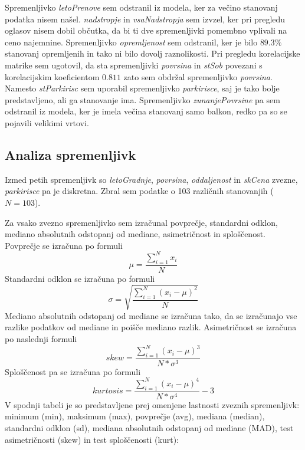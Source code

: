 \documentclass[a4paper, 12pt]{article}
\begin{document}
Spremenljivko \textit{letoPrenove} sem odstranil iz modela, ker za večino
stanovanj podatka nisem našel. \textit{nadstropje} in \textit{vsaNadstropja}
sem izvzel, ker pri pregledu oglasov nisem dobil občutka, da bi ti dve
spremenljivki pomembno vplivali na ceno najemnine. Spremenljivko
\textit{opremljenost} sem odstranil, ker je bilo $ 89.3\% $ stanovanj
opremljenih in tako ni bilo dovolj raznolikosti. Pri pregledu korelacijske
matrike sem ugotovil, da sta spremenljivki \textit{povrsina} in
\textit{stSob} povezani s korelacijskim koeficientom $ 0.811 $ zato sem obdržal
spremenljivko \textit{povrsina}. Namesto \textit{stParkirisc} sem uporabil
spremenljivko \textit{parkirisce}, saj je tako bolje predstavljeno, ali ga
stanovanje ima. Spremenljivko \textit{zunanjePovrsine} pa sem  odstranil iz
modela, ker je imela večina stanovanj samo balkon, redko pa so se pojavili
velikimi vrtovi.

\subsection{Analiza spremenljivk}

Izmed petih spremenljivk so \textit{letoGradnje}, \textit{povrsina},
\textit{oddaljenost} in \textit{skCena} zvezne, \textit{parkirisce} pa je
diskretna. Zbral sem podatke o 103 različnih stanovanjih ($ N = 103 $).

Za vsako zvezno spremenljivko sem izračunal povprečje, standardni odklon,
mediano absolutnih odstopanj od mediane, asimetričnost in sploščenost.
Povprečje se izračuna po formuli
\begin{equation}
	\mu = \frac{\sum\limits_{i=1}^{N} x_{i}}{N}
\end{equation}
Standardni odklon se izračuna po formuli
\begin{equation}
	\sigma = \sqrt{\frac{\sum\limits_{i=1}^{N}\left(x_{i}-\mu\right)^{2}}{N}}
\end{equation}
Mediano absolutnih odstopanj od mediane se izračuna tako, da se izračunajo vse
razlike podatkov od mediane in poišče mediano razlik. \newline
Asimetričnost se izračuna po naslednji formuli
\begin{equation}
	skew = \frac{\sum\limits_{i=1}^{N}\left(x_{i}-\mu\right)^{3}}{N*\sigma^{3}}
\end{equation}
Sploščenost pa se izračuna po formuli
\begin{equation}
	kurtosis = \frac{\sum\limits_{i=1}^{N}\left(x_{i}-\mu\right)^{4}}{N*\sigma^{4}}-3
\end{equation}
\newline
V spodnji tabeli je so predstavljene prej omenjene lastnosti zveznih
spremenljivk: minimum (min), maksimum (max), povprečje (avg), mediana (median),
standardni odklon (sd), mediana absolutnih odstopanj od mediane (MAD), test
asimetričnosti (skew) in test sploščenosti (kurt):
\end{document}
